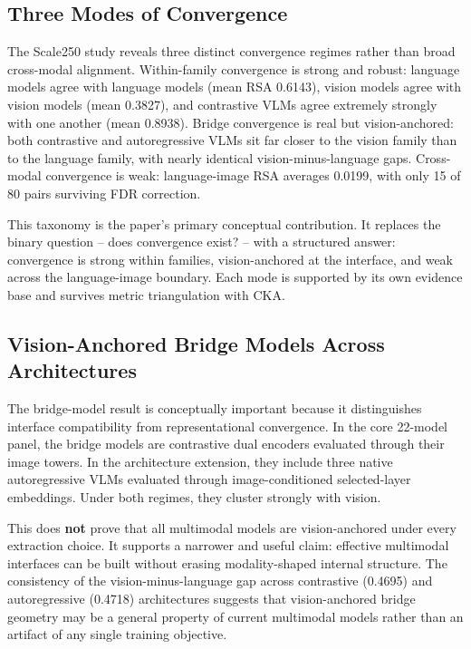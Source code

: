 \documentclass[10pt]{article}
\begin{document}
\subsection{Three Modes of
Convergence}\label{three-modes-of-convergence}

The Scale250 study reveals three distinct convergence regimes rather
than broad cross-modal alignment. Within-family convergence is strong
and robust: language models agree with language models (mean RSA
0.6143), vision models agree with vision models (mean 0.3827), and
contrastive VLMs agree extremely strongly with one another (mean
0.8938). Bridge convergence is real but vision-anchored: both
contrastive and autoregressive VLMs sit far closer to the vision family
than to the language family, with nearly identical vision-minus-language
gaps. Cross-modal convergence is weak: language-image RSA averages
0.0199, with only 15 of 80 pairs surviving FDR correction.

This taxonomy is the paper's primary conceptual contribution. It
replaces the binary question -- does convergence exist? -- with a
structured answer: convergence is strong within families,
vision-anchored at the interface, and weak across the language-image
boundary. Each mode is supported by its own evidence base and survives
metric triangulation with CKA.

\subsection{Vision-Anchored Bridge Models Across
Architectures}\label{vision-anchored-bridge-models-across-architectures}

The bridge-model result is conceptually important because it
distinguishes interface compatibility from representational convergence.
In the core 22-model panel, the bridge models are contrastive dual
encoders evaluated through their image towers. In the architecture
extension, they include three native autoregressive VLMs evaluated
through image-conditioned selected-layer embeddings. Under both regimes,
they cluster strongly with vision.

This does \textbf{not} prove that all multimodal models are
vision-anchored under every extraction choice. It supports a narrower
and useful claim: effective multimodal interfaces can be built without
erasing modality-shaped internal structure. The consistency of the
vision-minus-language gap across contrastive (0.4695) and autoregressive
(0.4718) architectures suggests that vision-anchored bridge geometry may
be a general property of current multimodal models rather than an
artifact of any single training objective.
\end{document}
